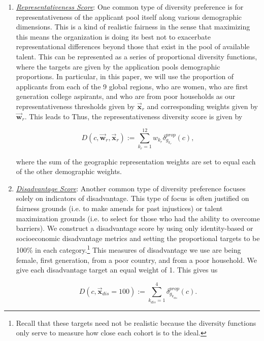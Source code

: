\begin{enumerate}
\item \underline{\emph{Representativeness Score}}: One common type of diversity preference is for representativeness of the applicant pool itself along various demographic dimensions. This is a kind of realistic fairness in the sense that maximizing this means the organization is doing its best not to exacerbate representational differences beyond those that exist in the pool of available talent. This can be represented as a series of proportional diversity functions, where the targets are given by the application pools demographic proportions. In particular, in this paper, we will use the proportion of applicants from each of the 9 global regions, who are women, who are first generation college aspirants, and who are from poor households as our representativeness thresholds given by $\vec{\mathbf{x}}_{r}$ and corresponding weights given by $\vec{\mathbf{w}}_{r}$. This leads to Thus, the representativeness diversity score is given by 

\begin{equation}
D(c,\vec{\mathbf{w}}_r, \vec{\mathbf{x}}_r) := \sum_{k_r = 1}^{12}w_{k_r}\delta_{g_{k_r}}^{prop}(c),
\end{equation}

\noindent where the sum of the geographic representation weights are set to equal each of the other demographic weights. 

\item \underline{\emph{Disadvantage Score}}: Another common type of diversity preference focuses solely on indicators of disadvantage. This type of focus is often justified on fairness grounds (i.e. to make amends for past injustices) or talent maximization grounds (i.e. to select for those who had the ability to overcome barriers). We construct a disadvantage score by using only identity-based or socioeconomic disadvantage metrics and setting the proportional targets to be 100\% in each category.\footnote{Recall that these targets need not be realistic because the diversity functions only serve to measure how close each cohort is to the ideal.} This measures of disadvantage we use are being female, first generation, from a poor country, and from a poor household. We give each disadvantage target an equal weight of 1. This gives us 

\begin{equation}
D(c,\vec{\mathbf{x}}_{dis} = 100) := \sum_{k_{dis} = 1}^{4}\delta_{g_{k_{dis}}}^{prop}(c).
\end{equation}


\end{enumerate}

